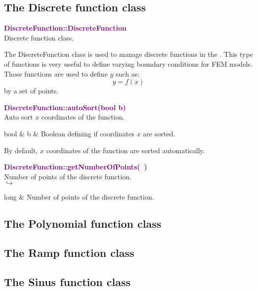 \subsection{The Discrete function class}

\textcolor{purple}{\textbf{DiscreteFunction::DiscreteFunction}}\label{DiscreteFunction::DiscreteFunction}\\
Discrete function class.

The DiscreteFunction class is used to manage discrete functions in the \DynELA.
This type of functions is very useful to define varying boundary conditions for FEM models.
Those functions are used to define $y$ such as:
\begin{equation*}
y=f(x)
\end{equation*}
by a set of points.

\textcolor{purple}{\textbf{DiscreteFunction::autoSort(bool b)}}\label{DiscreteFunction::autoSort(bool b)}\\
Auto sort $x$ coordinates of the function.

\begin{tcolorbox}[width=\textwidth,myArgs,tabularx={ll|R}]
bool & b & Boolean defining if coordinates $x$ are sorted.
\end{tcolorbox}

By default, $x$ coordinates of the function are sorted automatically.

\textcolor{purple}{\textbf{DiscreteFunction::getNumberOfPoints(~)}}\label{DiscreteFunction::getNumberOfPoints()}\\
Number of points of the discrete function.\\ \hspace*{5mm}$\hookrightarrow$
\vspace*{-2em}\begin{tcolorbox}[grow to left by=-1cm, width=\textwidth-1cm,myArgs,tabularx={l|R}]
long & Number of points of the discrete function.
\end{tcolorbox}



\subsection{The Polynomial function class}

\subsection{The Ramp function class}

\subsection{The Sinus function class}
